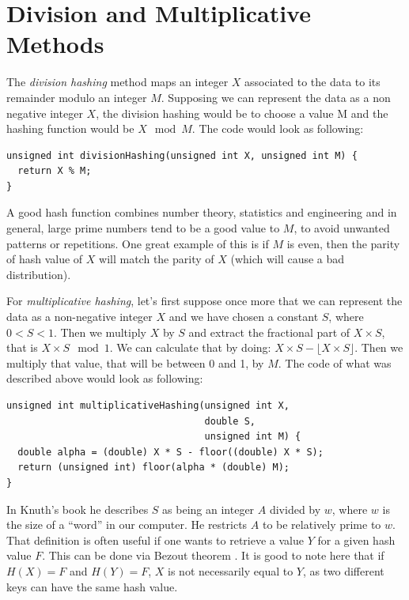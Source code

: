 \section{Division and Multiplicative Methods}

The \textit{division hashing} method maps an integer \( X \) associated to the data to its remainder modulo an integer \( M \). Supposing we can represent the data as a non negative integer \( X \), the division hashing would be to choose a value M and the hashing function would be \( X \mod M \). The code would look as following:

\begin{lstlisting}
unsigned int divisionHashing(unsigned int X, unsigned int M) {
  return X % M;
}
\end{lstlisting}

A good hash function combines number theory, statistics and engineering and in general, large prime numbers tend to be a good value to \( M \), to avoid unwanted patterns or repetitions. One great example of this is if \( M \) is even, then the parity of hash value of \( X \) will match the parity of \( X \) (which will cause a bad distribution).

For \textit{multiplicative hashing}, let's first suppose once more that we can represent the data as a non-negative integer \( X \) and we have chosen a constant \( S \), where \( 0 < S < 1 \). Then we multiply \( X \) by \( S \) and extract the fractional part of \( X \times S \), that is \( X \times S \mod  1 \). We can calculate that by doing: \( X \times S - \lfloor X \times S \rfloor \). Then we multiply that value, that will be between 0 and 1, by \( M \). The code of what was described above would look as following:

\medskip

\begin{lstlisting}
unsigned int multiplicativeHashing(unsigned int X,
                                   double S,
                                   unsigned int M) {
  double alpha = (double) X * S - floor((double) X * S);
  return (unsigned int) floor(alpha * (double) M);
}
\end{lstlisting}

In Knuth's book he describes \( S \) as being an integer \( A \) divided by \( w \), where \( w \) is the size of a ``word'' in our computer. He restricts \( A \) to be relatively prime to \( w \). That definition is often useful if one wants to retrieve a value \( Y \) for a given hash value \( F \). This can be done via Bezout theorem \citep{TAOCP3}. It is good to note here that if \( H(X) = F \) and \( H(Y) = F \), \( X \) is not necessarily equal to \( Y \), as two different keys can have the same hash value.

